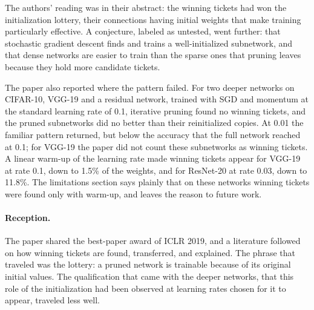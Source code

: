 \begin{refsection}
The authors' reading was in their abstract: the winning tickets had won the initialization lottery, their connections having initial weights that make training particularly effective. A conjecture, labeled as untested, went further: that stochastic gradient descent finds and trains a well-initialized subnetwork, and that dense networks are easier to train than the sparse ones that pruning leaves because they hold more candidate tickets.

The paper also reported where the pattern failed. For two deeper networks on CIFAR-10, VGG-19 and a residual network, trained with SGD and momentum at the standard learning rate of 0.1, iterative pruning found no winning tickets, and the pruned subnetworks did no better than their reinitialized copies. At 0.01 the familiar pattern returned, but below the accuracy that the full network reached at 0.1; for VGG-19 the paper did not count these subnetworks as winning tickets. A linear warm-up of the learning rate made winning tickets appear for VGG-19 at rate 0.1, down to 1.5\% of the weights, and for ResNet-20 at rate 0.03, down to 11.8\%. The limitations section says plainly that on these networks winning tickets were found only with warm-up, and leaves the reason to future work.

\paragraph{Reception.} The paper shared the best-paper award of ICLR 2019, and a literature followed on how winning tickets are found, transferred, and explained. The phrase that traveled was the lottery: a pruned network is trainable because of its original initial values. The qualification that came with the deeper networks, that this role of the initialization had been observed at learning rates chosen for it to appear, traveled less well.


\end{refsection}

